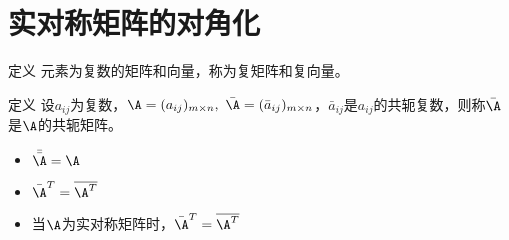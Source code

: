 \section{实对称矩阵的对角化}

\begin{frame}
  \begin{footnotesize}
    \begin{block}{定义}
      元素为复数的矩阵和向量，称为复矩阵和复向量。
    \end{block}

    \begin{block}{定义}
      设$a_{ij}$为复数，$\A=(a_{ij})_{m\times n},~\bar\A=(\bar a_{ij})_{m\times n}$，$\bar a_{ij}$是$a_{ij}$的共轭复数，则称$\bar \A$是$\A$的共轭矩阵。
    \end{block}


    \begin{itemize}
    \item $\bar {\bar \A} = \A$
    \item ${\bar \A}^T = \overline{\A^T}$
    \item 当$\A$为实对称矩阵时，${\bar \A}^T = \overline{\A^T}$
    \end{itemize}
  \end{footnotesize}
\end{frame}
